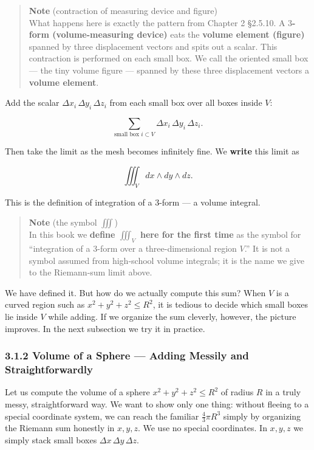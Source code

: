 \documentclass[a4paper,12pt,openany]{book}
\begin{document}
\begin{quote}
\textbf{Note} (contraction of measuring device and figure)\\
What happens here is exactly the pattern from Chapter 2 §2.5.10. A
\textbf{$3$-form (volume-measuring device)} eats the
\textbf{volume element (figure)} spanned by three displacement vectors
and spits out a scalar. This contraction is performed on each small box.
We call the oriented small box — the tiny volume figure — spanned by
these three displacement vectors a \textbf{volume element}.
\end{quote}

Add the scalar \(\Delta x_i\,\Delta y_i\,\Delta z_i\) from each small
box over all boxes inside \(V\):

\[\sum_{\text{small box }i \subset V} \Delta x_i\,\Delta y_i\,\Delta z_i.\]

Then take the limit as the mesh becomes infinitely fine. We
\textbf{write} this limit as

\[\iiint_V dx \wedge dy \wedge dz.\]

This is the definition of integration of a \(3\)-form — a volume
integral.

\begin{quote}
\textbf{Note} (the symbol \(\iiint\))\\
In this book we \textbf{define $\iiint_V$ here for the first time} as
the symbol for ``integration of a \(3\)-form over a three-dimensional
region \(V\).'' It is not a symbol assumed from high-school volume
integrals; it is the name we give to the Riemann-sum limit above.
\end{quote}

We have defined it. But how do we actually compute this sum? When \(V\)
is a curved region such as \(x^2+y^2+z^2 \le R^2\), it is tedious to
decide which small boxes lie inside \(V\) while adding. If we organize
the sum cleverly, however, the picture improves. In the next subsection
we try it in practice.

\hypertarget{volume-of-a-sphere-adding-messily-and-straightforwardly}{%
\subsubsection{3.1.2 Volume of a Sphere — Adding Messily and
Straightforwardly}\label{volume-of-a-sphere-adding-messily-and-straightforwardly}}

Let us compute the volume of a sphere \(x^2 + y^2 + z^2 \le R^2\) of
radius \(R\) in a truly messy, straightforward way. We want to show only
one thing: without fleeing to a special coordinate system, we can reach
the familiar \(\frac{4}{3}\pi R^3\) simply by organizing the Riemann sum
honestly in \(x,y,z\). We use no special coordinates. In \(x,y,z\) we
simply stack small boxes \(\Delta x\,\Delta y\,\Delta z\).
\end{document}
